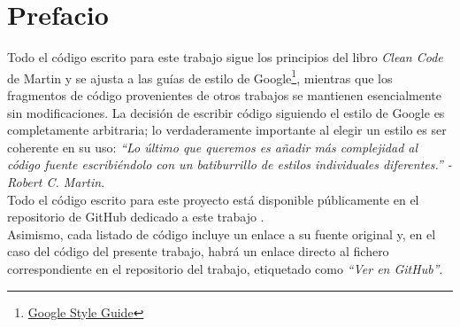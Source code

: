 \chapter*{Prefacio} 
Todo el código escrito para este trabajo sigue los principios del libro \textit{Clean Code} de Martin \cite{Martin:2009:Clean} y se ajusta a las guías de estilo de Google\footnote{\href{https://google.github.io/styleguide/}{Google Style Guide}}, mientras que los fragmentos de código provenientes de otros trabajos se mantienen esencialmente sin modificaciones. La decisión de escribir código siguiendo el estilo de Google es completamente arbitraria; lo verdaderamente importante al elegir un estilo es ser coherente en su uso: \textit{``Lo último que queremos es añadir más complejidad al código fuente escribiéndolo con un batiburrillo de estilos individuales diferentes.'' - Robert C. Martin}.\\

Todo el código escrito para este proyecto está disponible públicamente en el repositorio de GitHub dedicado a este trabajo \cite{URL::TFG}.\\

Asimismo, cada listado de código incluye un enlace a su fuente original y, en el caso del código del presente trabajo, habrá un enlace directo al fichero correspondiente en el repositorio del trabajo, etiquetado como \textit{``Ver en GitHub''}.